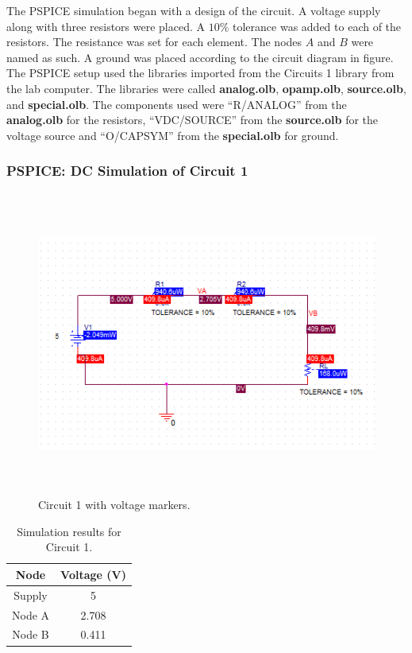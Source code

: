 \documentclass[11pt]{article}
\begin{document}
The PSPICE simulation began with a design of the circuit. A voltage supply along with three resistors were placed. A $10\percent$ tolerance was added to each of the resistors. The resistance was set for each element. The nodes $A$ and $B$ were named as such. A ground was placed according to the circuit diagram in figure. The PSPICE setup used the libraries imported from the Circuits 1 library from the lab computer. The libraries were called \textbf{analog.olb}, \textbf{opamp.olb}, \textbf{source.olb}, and \textbf{special.olb}. The components used were ``R/ANALOG'' from the \textbf{analog.olb} for the resistors, ``VDC/SOURCE'' from the \textbf{source.olb} for the voltage source and ``O/CAPSYM'' from the \textbf{special.olb} for ground.

\subsubsection{PSPICE: DC Simulation of Circuit 1}

\begin{figure}[htbp]
	\centering
	\includegraphics[height=10cm]{schematic}
	\caption{Circuit 1 with voltage markers.}
	\label{Fig:Circuit1VoltageMarkers}
\end{figure}

\begin{table}[h!]
	\caption{Simulation results for Circuit 1.}
	\begin{center}
		\begin{tabular}{|c||c|}
			\hline
			Node & Voltage (\si{\volt}) \\
			\hline
			Supply & 5 \\	 
			\hline 
			Node A & 2.708 \\	 
			\hline
			Node B & 0.411 \\	 
			\hline			
		\end{tabular}
	\end{center}
	\label{Table: Circuit 1}
\end{table}	
\end{document}
